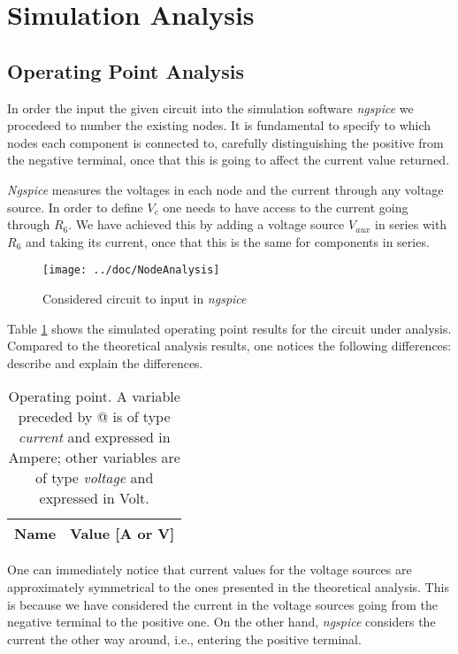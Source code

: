 \section{Simulation Analysis}
\label{sec:simulation}

\subsection{Operating Point Analysis}

In order the input the given circuit into the simulation software \emph{ngspice} we procedeed to number the existing nodes. It is fundamental to specify to which nodes each component is connected to, carefully distinguishing the positive from the negative terminal, once that this is going to affect the current value returned.

\emph{Ngspice} measures the voltages in each node and the current through any voltage source. In order to define $V_c$ one needs to have access to the current going through $R_6$. We have achieved this by adding a voltage source $V_{aux}$ in series with $R_6$ and taking its current, once that this is the same for components in series.

\begin{figure}[H]
  \centering
  \texttt{[image: ../doc/NodeAnalysis]}
  \caption{Considered circuit to input in \emph{ngspice}}
  \label{fig:fignodos}
\end{figure}


Table \ref{tab:ngspice} shows the simulated operating point results for the circuit
under analysis. Compared to the theoretical analysis results, one notices the
following differences: describe and explain the differences.

\begin{table}[H]
  \centering
  \begin{tabular}{|l|r|}
    \hline
    {\bf Name} & {\bf Value [A or V]} \\ \hline
    
  \end{tabular}
  \caption{Operating point. A variable preceded by @ is of type {\em current}
    and expressed in Ampere; other variables are of type {\it voltage} and expressed in
    Volt.}
  \label{tab:ngspice}
\end{table}

One can immediately notice that current values for the voltage sources are approximately  symmetrical to the ones presented in the theoretical analysis. This is because we have considered the current in the voltage sources going from the negative terminal to the positive one. On the other hand, \emph{ngspice} considers the current the other way around, i.e., entering the positive terminal.



